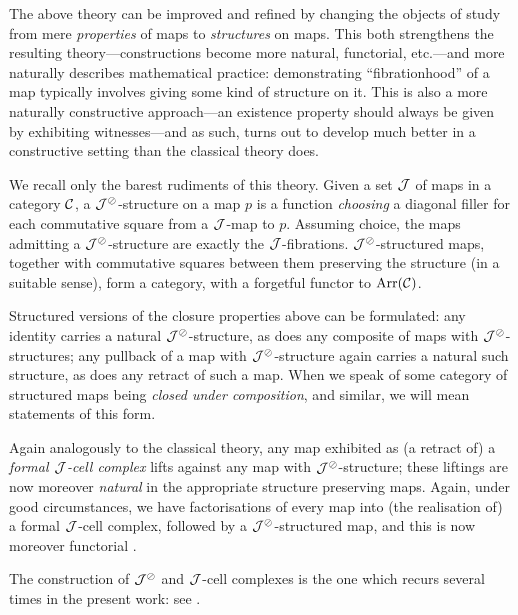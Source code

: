 \begin{para}
The above theory can be improved and refined by changing the objects of study from mere \emph{properties} of maps to \emph{structures} on maps.  This both strengthens the resulting theory---constructions become more natural, functorial, etc.---and more naturally describes mathematical practice: demonstrating ``fibrationhood'' of a map typically involves giving some kind of structure on it.  This is also a more naturally constructive approach---an existence property should always be given by exhibiting witnesses---and as such, turns out to develop much better in a constructive setting than the classical theory does.

We recall only the barest rudiments of this theory.  Given a set $\mathcal{J}$ of maps in a category $\mathcal{C}$, a \emph{$\mathcal{J}^\oslash$}-structure on a map $p$ is a function \emph{choosing} a diagonal filler for each commutative square from a $\mathcal{J}$-map to $p$.  Assuming choice, the maps admitting a $\mathcal{J}^\oslash$-structure are exactly the $\mathcal{J}$-fibrations. $\mathcal{J}^\oslash$-structured maps, together with commutative squares between them preserving the structure (in a suitable sense), form a category, with a forgetful functor to $\mathrm{Arr}(\mathcal{C})$.

Structured versions of the closure properties above can be formulated: any identity carries a natural $\mathcal{J}^\oslash$-structure, as does any composite of maps with $\mathcal{J}^\oslash$-structures; any pullback of a map with $\mathcal{J}^\oslash$-structure again carries a natural such structure, as does any retract of such a map.  When we speak of some category of structured maps being \emph{closed under composition}, and similar, we will mean statements of this form.

Again analogously to the classical theory, any map exhibited as (a retract of) a \emph{formal $\mathcal{J}$-cell complex} lifts against any map with $\mathcal{J}^\oslash$-structure; these liftings are now moreover \emph{natural} in the appropriate structure preserving maps.  Again, under good circumstances, we have factorisations of every map into (the realisation of) a formal $\mathcal{J}$-cell complex, followed by a $\mathcal{J}^\oslash$-structured map, and this is now moreover functorial \cite{garner:understanding}.

The construction of $\mathcal{J}^\oslash$ and $\mathcal{J}$-cell complexes is the one which recurs several times in the present work: see .
\end{para}


